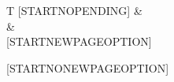 {\begin{longtable}{T}
[STARTNOPENDING]
&\\
&{}\\
[ENDNOPENDING]

[STARTNEWPAGEOPTION]
\n \newpage \n
[ENDNEWPAGEOPTION]

[STARTNONEWPAGEOPTION]
\n \bigskip \n
[ENDNONEWPAGEOPTION]

\hline
\end{longtable}
}
{%
}

